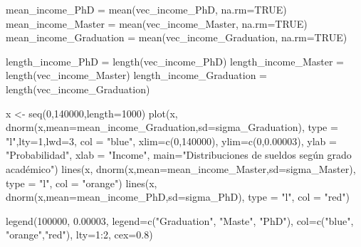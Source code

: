 \documentclass[]{article}
\newenvironment{Shaded}{\begin{snugshade}}{\end{snugshade}}
\newcommand{\AttributeTok}[1]{\textcolor[rgb]{0.77,0.63,0.00}{#1}}
\newcommand{\ConstantTok}[1]{\textcolor[rgb]{0.00,0.00,0.00}{#1}}
\newcommand{\DecValTok}[1]{\textcolor[rgb]{0.00,0.00,0.81}{#1}}
\newcommand{\FloatTok}[1]{\textcolor[rgb]{0.00,0.00,0.81}{#1}}
\newcommand{\FunctionTok}[1]{\textcolor[rgb]{0.00,0.00,0.00}{#1}}
\newcommand{\NormalTok}[1]{#1}
\newcommand{\OtherTok}[1]{\textcolor[rgb]{0.56,0.35,0.01}{#1}}
\newcommand{\SpecialCharTok}[1]{\textcolor[rgb]{0.00,0.00,0.00}{#1}}
\newcommand{\StringTok}[1]{\textcolor[rgb]{0.31,0.60,0.02}{#1}}
\begin{document}
\begin{Shaded}
\begin{Highlighting}[]
\NormalTok{mean\_income\_PhD }\OtherTok{=} \FunctionTok{mean}\NormalTok{(vec\_income\_PhD, }\AttributeTok{na.rm=}\ConstantTok{TRUE}\NormalTok{)}
\NormalTok{mean\_income\_Master }\OtherTok{=} \FunctionTok{mean}\NormalTok{(vec\_income\_Master, }\AttributeTok{na.rm=}\ConstantTok{TRUE}\NormalTok{) }
\NormalTok{mean\_income\_Graduation }\OtherTok{=} \FunctionTok{mean}\NormalTok{(vec\_income\_Graduation, }\AttributeTok{na.rm=}\ConstantTok{TRUE}\NormalTok{)}

\NormalTok{length\_income\_PhD }\OtherTok{=} \FunctionTok{length}\NormalTok{(vec\_income\_PhD)}
\NormalTok{length\_income\_Master }\OtherTok{=} \FunctionTok{length}\NormalTok{(vec\_income\_Master) }
\NormalTok{length\_income\_Graduation }\OtherTok{=} \FunctionTok{length}\NormalTok{(vec\_income\_Graduation)}


\NormalTok{x }\OtherTok{\textless{}{-}} \FunctionTok{seq}\NormalTok{(}\DecValTok{0}\NormalTok{,}\DecValTok{140000}\NormalTok{,}\AttributeTok{length=}\DecValTok{1000}\NormalTok{)}
\FunctionTok{plot}\NormalTok{(x, }\FunctionTok{dnorm}\NormalTok{(x,}\AttributeTok{mean=}\NormalTok{mean\_income\_Graduation,}\AttributeTok{sd=}\NormalTok{sigma\_Graduation), }\AttributeTok{type =} \StringTok{"l"}\NormalTok{,}\AttributeTok{lty=}\DecValTok{1}\NormalTok{,}\AttributeTok{lwd=}\DecValTok{3}\NormalTok{, }\AttributeTok{col =} \StringTok{"blue"}\NormalTok{, }\AttributeTok{xlim=}\FunctionTok{c}\NormalTok{(}\DecValTok{0}\NormalTok{,}\DecValTok{140000}\NormalTok{), }\AttributeTok{ylim=}\FunctionTok{c}\NormalTok{(}\DecValTok{0}\NormalTok{,}\FloatTok{0.00003}\NormalTok{), }\AttributeTok{ylab =} \StringTok{"Probabilidad"}\NormalTok{, }\AttributeTok{xlab =} \StringTok{"Income"}\NormalTok{, }\AttributeTok{main=}\StringTok{"Distribuciones de sueldos según grado académico"}\NormalTok{)}
\FunctionTok{lines}\NormalTok{(x, }\FunctionTok{dnorm}\NormalTok{(x,}\AttributeTok{mean=}\NormalTok{mean\_income\_Master,}\AttributeTok{sd=}\NormalTok{sigma\_Master), }\AttributeTok{type =} \StringTok{"l"}\NormalTok{, }\AttributeTok{col =} \StringTok{"orange"}\NormalTok{)}
\FunctionTok{lines}\NormalTok{(x, }\FunctionTok{dnorm}\NormalTok{(x,}\AttributeTok{mean=}\NormalTok{mean\_income\_PhD,}\AttributeTok{sd=}\NormalTok{sigma\_PhD), }\AttributeTok{type =} \StringTok{"l"}\NormalTok{, }\AttributeTok{col =} \StringTok{"red"}\NormalTok{)}

\FunctionTok{legend}\NormalTok{(}\DecValTok{100000}\NormalTok{, }\FloatTok{0.00003}\NormalTok{, }\AttributeTok{legend=}\FunctionTok{c}\NormalTok{(}\StringTok{"Graduation"}\NormalTok{, }\StringTok{"Maste"}\NormalTok{, }\StringTok{"PhD"}\NormalTok{),}
       \AttributeTok{col=}\FunctionTok{c}\NormalTok{(}\StringTok{"blue"}\NormalTok{, }\StringTok{"orange"}\NormalTok{,}\StringTok{"red"}\NormalTok{), }\AttributeTok{lty=}\DecValTok{1}\SpecialCharTok{:}\DecValTok{2}\NormalTok{, }\AttributeTok{cex=}\FloatTok{0.8}\NormalTok{)}
\end{Highlighting}
\end{Shaded}
\end{document}
